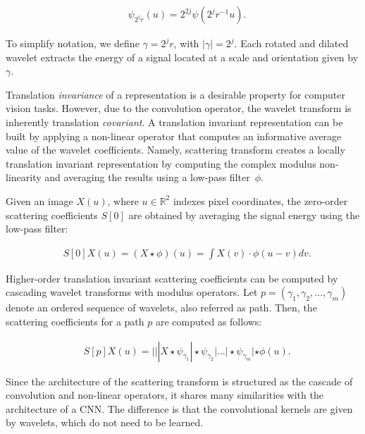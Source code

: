 \documentclass[11pt]{article}
\theoremstyle{definition}
\newcommand{\MotherWavelet}{\psi}
\newcommand{\ScalingFunction}{\phi}
\newcommand{\Orientation}{\gamma}
\newcommand{\Input}{X}
\newcommand{\ScatteringCoefficients}{S}
\newcommand{\Path}{p}
\begin{document}
\begin{align}
& \MotherWavelet_{2^{j} r}(u) = 2^{2j} \MotherWavelet(2^{j} r^{-1} u ).
\end{align}

To simplify notation, we define $\Orientation = 2^{j} r$, with $|\Orientation|=2^{j}$. Each rotated and dilated wavelet extracts the energy of a signal located at a scale and orientation given by $\Orientation$.

Translation \textit{invariance} of a representation is a desirable property for computer vision tasks. However, due to the convolution operator, the wavelet transform is inherently translation \textit{covariant}. A translation invariant representation can be built by applying a non-linear operator that computes an informative average value of the wavelet coefficients.
Namely, scattering transform creates a locally translation invariant representation by computing the complex modulus non-linearity and averaging the results using a low-pass filter~$\ScalingFunction$. 

Given an image $\Input(u)$, where $u \in \mathbb{R}^2$ indexes pixel coordinates, the zero-order scattering coefficients $\ScatteringCoefficients[0]$ are obtained by averaging the signal energy using the low-pass filter:

\begin{align}
& \ScatteringCoefficients[0] \Input(u) = (\Input \star \ScalingFunction) (u) = \int \Input(v) \cdot \ScalingFunction(u-v) dv.
\end{align}


Higher-order translation invariant scattering coefficients can be computed by cascading wavelet transforms with modulus operators. Let $\Path = (\Orientation_1, \Orientation_2, ...,  \Orientation_m)$ denote an ordered sequence of wavelets, also referred as path. Then, the scattering coefficients for a path $\Path$ are computed as follows:


\begin{align}
& \ScatteringCoefficients[p] \Input(u) = | | |\Input \star \MotherWavelet_{\Orientation_1}|
\star \MotherWavelet_{\Orientation_2} | ... | \star \MotherWavelet_{\Orientation_m} | \star \ScalingFunction(u).    	
\end{align}

Since the architecture of the scattering transform is structured as the cascade of convolution and non-linear operators, it shares many similarities with the architecture of a CNN.
The difference is that the convolutional kernels are given by wavelets, which do not need to be learned.
\end{document}
